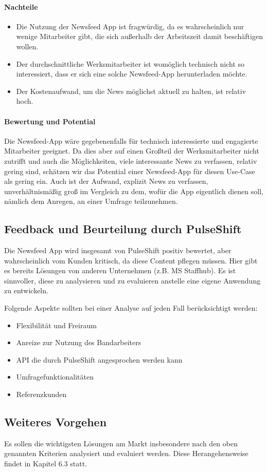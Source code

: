 \paragraph{Nachteile}

\begin{itemize}
\item Die Nutzung der Newsfeed App ist fragwürdig, da es wahrscheinlich nur wenige Mitarbeiter gibt, die sich außerhalb der Arbeitszeit damit beschäftigen wollen.
\item Der durchschnittliche Werksmitarbeiter ist womöglich technisch nicht so interessiert, dass er sich eine solche Newsfeed-App herunterladen möchte.
\item Der Kostenaufwand, um die News möglichst aktuell zu halten, ist relativ hoch.
\end{itemize}

\paragraph{Bewertung und Potential}

Die Newsfeed-App wäre gegebenenfalls für technisch interessierte und engagierte Mitarbeiter geeignet. Da dies aber auf einen Großteil der Werksmitarbeiter nicht zutrifft und auch die Möglichkeiten, viele interessante News zu verfassen, relativ gering sind, schätzen wir das Potential einer Newsfeed-App für diesen Use-Case als gering ein. Auch ist der Aufwand, explizit News zu verfassen, unverhältnismäßig groß im Vergleich zu dem, wofür die App eigentlich dienen soll, nämlich dem Anregen, an einer Umfrage teilzunehmen.

\subsection{Feedback und Beurteilung durch PulseShift}

Die Newsfeed App wird  insgesamt von PulseShift positiv bewertet, aber wahrscheinlich vom Kunden kritisch, da diese Content pflegen müssen. Hier gibt es bereits Lösungen von anderen Unternehmen (z.B. MS Staffhub). Es ist sinnvoller, diese zu analysieren und zu evaluieren anstelle eine eigene Anwendung zu entwickeln. 

Folgende Aspekte sollten bei einer Analyse auf jeden Fall berücksichtigt werden: 

\begin{itemize}
\item Flexibilität und Freiraum
\item Anreize zur Nutzung des Bandarbeiters
\item API die durch PulseShift angesprochen werden kann
\item Umfragefunktionalitäten
\item Referenzkunden
\end{itemize}

\subsection{Weiteres Vorgehen}

Es sollen die wichtigsten Lösungen am Markt insbesondere nach den oben genannten Kriterien analysiert und evaluiert werden. Diese Herangehensweise findet in Kapitel 6.3 statt.
